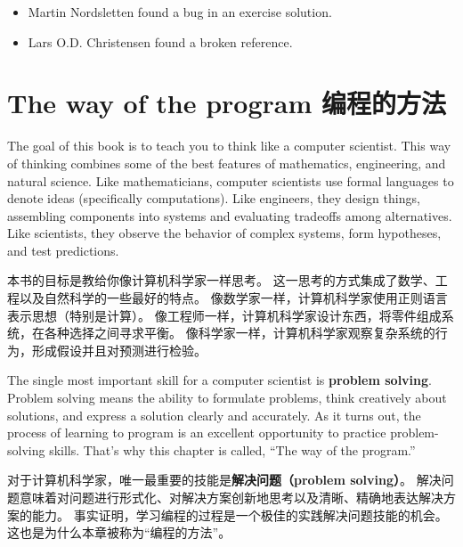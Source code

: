 \documentclass[10pt]{book}
\begin{document}
\begin{CJK}{UTF8}{gbsn}
\begin{itemize}
\item Martin Nordsletten found a bug in an exercise solution.

\item Lars O.D. Christensen found a broken reference.


\end{itemize}

\normalsize
\clearemptydoublepage

\begin{latexonly}

\tableofcontents

\clearemptydoublepage

\end{latexonly}

\mainmatter

\chapter{The way of the program 编程的方法}

The goal of this book is to teach you to think like a
computer scientist.  This way of thinking combines some of the best features
of mathematics, engineering, and natural science.  Like mathematicians,
computer scientists use formal languages to denote ideas (specifically
computations).  Like engineers, they design things, assembling components
into systems and evaluating tradeoffs among alternatives.  Like scientists,
they observe the behavior of complex systems, form hypotheses, and test
predictions.

本书的目标是教给你像计算机科学家一样思考。
这一思考的方式集成了数学、工程以及自然科学的一些最好的特点。
像数学家一样，计算机科学家使用正则语言表示思想（特别是计算）。
像工程师一样，计算机科学家设计东西，将零件组成系统，在各种选择之间寻求平衡。
像科学家一样，计算机科学家观察复杂系统的行为，形成假设并且对预测进行检验。

The single most important skill for a computer scientist is {\bf
problem solving}.  Problem solving means the ability to formulate
problems, think creatively about solutions, and express a solution clearly
and accurately.  As it turns out, the process of learning to program is an
excellent opportunity to practice problem-solving skills.  That's why
this chapter is called, ``The way of the program.''

对于计算机科学家，唯一最重要的技能是{\bf 解决问题（problem solving）}。
解决问题意味着对问题进行形式化、对解决方案创新地思考以及清晰、精确地表达解决方案的能力。
事实证明，学习编程的过程是一个极佳的实践解决问题技能的机会。
这也是为什么本章被称为``编程的方法''。


\end{CJK}
\end{document}
